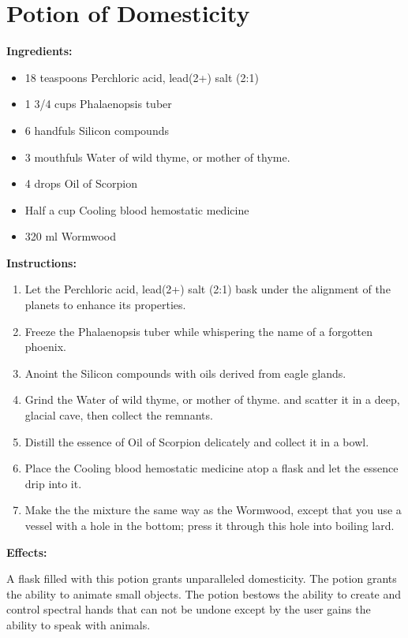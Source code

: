 \documentclass{article}
\begin{document}
\newpage
\section*{Potion of Domesticity}

\textbf{Ingredients:}

\begin{itemize}
  \item 18 teaspoons Perchloric acid, lead(2+) salt (2:1)
  \item 1 3/4 cups Phalaenopsis tuber
  \item 6 handfuls Silicon compounds
  \item 3 mouthfuls Water of wild thyme, or mother of thyme.
  \item 4 drops Oil of Scorpion
  \item Half a cup Cooling blood hemostatic medicine
  \item 320 ml Wormwood
\end{itemize}

\textbf{Instructions:}

\begin{enumerate}
  \item Let the Perchloric acid, lead(2+) salt (2:1) bask under the alignment of the planets to enhance its properties.
  \item Freeze the Phalaenopsis tuber while whispering the name of a forgotten phoenix.
  \item Anoint the Silicon compounds with oils derived from eagle glands.
  \item Grind the Water of wild thyme, or mother of thyme. and scatter it in a deep, glacial cave, then collect the remnants.
  \item Distill the essence of Oil of Scorpion delicately and collect it in a bowl.
  \item Place the Cooling blood hemostatic medicine atop a flask and let the essence drip into it.
  \item Make the the mixture the same way as the Wormwood, except that you use a vessel with a hole in the bottom; press it through this hole into boiling lard.
\end{enumerate}

\textbf{Effects:}

A flask filled with this potion grants unparalleled domesticity. The potion grants the ability to animate small objects. The potion bestows the ability to create and control spectral hands that can not be undone except by the user gains the ability to speak with animals.
\end{document}
